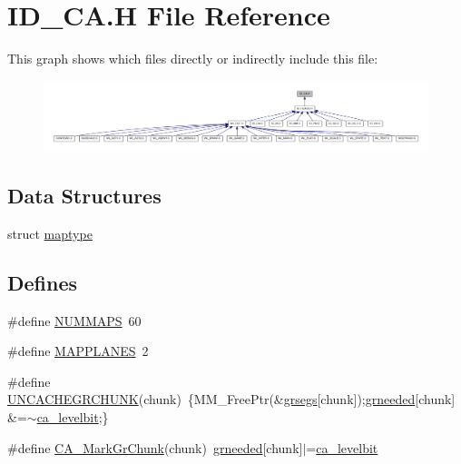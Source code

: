\hypertarget{ID__CA_8H}{
\section{ID\_\-CA.H File Reference}
\label{ID__CA_8H}
}
This graph shows which files directly or indirectly include this file:
\nopagebreak
\begin{figure}[H]
\begin{center}
\leavevmode
\includegraphics[width=400pt]{ID__CA_8H__dep__incl}
\end{center}
\end{figure}
\subsection*{Data Structures}
\begin{DoxyCompactItemize}
\item 
struct \hyperlink{structmaptype}{maptype}
\end{DoxyCompactItemize}
\subsection*{Defines}
\begin{DoxyCompactItemize}
\item 
\#define \hyperlink{ID__CA_8H_a45782a2ff2fa52a30032ae44b8789f3f}{NUMMAPS}~60
\item 
\#define \hyperlink{ID__CA_8H_ac8cfed3db4dc392ab58ef900e7a31548}{MAPPLANES}~2
\item 
\#define \hyperlink{ID__CA_8H_a6e78edab29e754af11d59d1a4efaf245}{UNCACHEGRCHUNK}(chunk)~\{MM\_\-FreePtr(\&\hyperlink{ID__CA_8H_aa0e5c34b0901c8cc15a60fe57cb09b3a}{grsegs}\mbox{[}chunk\mbox{]});\hyperlink{ID__CA_8H_aff6ae5a74b0467508c14a3f3b91ffd90}{grneeded}\mbox{[}chunk\mbox{]}\&=$\sim$\hyperlink{ID__CA_8H_af4f718356e28be31a81ef4df1a2f7c96}{ca\_\-levelbit};\}
\item 
\#define \hyperlink{ID__CA_8H_abf3c86ab4ce00e09f0b1086ee8413ef7}{CA\_\-MarkGrChunk}(chunk)~\hyperlink{ID__CA_8H_aff6ae5a74b0467508c14a3f3b91ffd90}{grneeded}\mbox{[}chunk\mbox{]}$|$=\hyperlink{ID__CA_8H_af4f718356e28be31a81ef4df1a2f7c96}{ca\_\-levelbit}
\end{DoxyCompactItemize}
